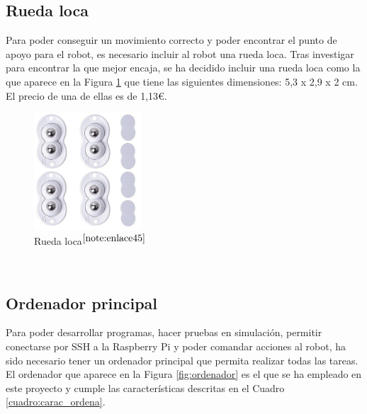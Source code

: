 \setcounter{footnote}{44} %

\subsection{Rueda loca}

Para poder conseguir un movimiento correcto y poder encontrar el punto de apoyo para el robot, es necesario incluir al robot una rueda loca. Tras investigar para encontrar la que mejor encaja, se ha decidido incluir una rueda loca como la que aparece en la Figura \ref{fig:ruedaloca} que tiene las siguientes dimensiones: 5,3 x 2,9 x 2 cm. El precio de una de ellas es de 1,13€.

\begin{figure} [h!]
	\begin{center}
		\includegraphics[width=4cm]{figs/ruedaloca.png}
	\end{center}
	\caption{Rueda loca$^{\ref{note:enlace45}}$} 
	\label{fig:ruedaloca}
\end{figure}\

\setcounter{footnote}{45} %

\subsection{Ordenador principal}

Para poder desarrollar programas, hacer pruebas en simulación, permitir conectarse por SSH a la Raspberry Pi y poder comandar acciones al robot, ha sido necesario tener un ordenador principal que permita realizar todas las tareas. El ordenador que aparece en la Figura \ref{fig:ordenador} es el que se ha empleado en este proyecto y cumple las características descritas en el Cuadro \ref{cuadro:carac_ordena}.


